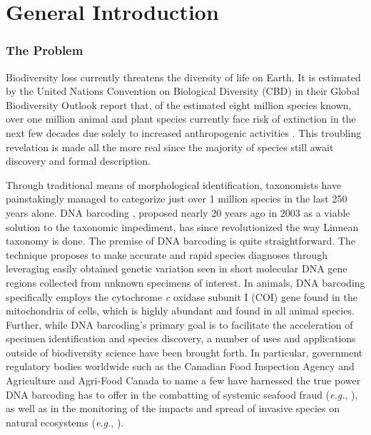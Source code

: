 \linespread{1.0}

\chapter{General Introduction}

\subsection{The Problem}

Biodiversity loss currently threatens the diversity of life on Earth. It is estimated by the United Nations Convention on Biological Diversity (CBD) in their Global Biodiversity Outlook report that, of the estimated eight million species known, over one million animal and plant species currently face risk of extinction in the next few decades due solely to increased anthropogenic activities \cite{cbd2020global}. This troubling revelation is made all the more real since the majority of species still await discovery and formal description. 

\vspace{5mm}

Through traditional means of morphological identification, taxonomists have \\ painstakingly managed to categorize just over 1 million species in the last 250 years alone. DNA barcoding \cite{hebert2003biological, hebert2003barcoding}, proposed nearly 20 years ago in 2003 as a viable solution to the taxonomic impediment, has since revolutionized the way Linnean taxonomy is done. The premise of DNA barcoding is quite straightforward. The technique proposes to make accurate and rapid species diagnoses through leveraging easily obtained genetic variation seen in short molecular DNA gene regions collected from unknown specimens of interest. In animals, DNA barcoding specifically employs the cytochrome \textit{c} oxidase subunit I (COI) gene found in the mitochondria of cells, which is highly abundant and found in all animal species. Further, while DNA barcoding's primary goal is to facilitate the acceleration of specimen identification and species discovery, a number of uses and applications outside of biodiversity science have been brought forth. In particular, government regulatory bodies worldwide such as the Canadian Food Inspection Agency and Agriculture and Agri-Food Canada to name a few have harnessed the true power DNA barcoding has to offer in the combatting of systemic seafood fraud (\textit{e.g.}, \cite{shehata2018dna, shehata2019survey}), as well as in the monitoring of the impacts and spread of invasive species on natural ecosystems (\textit{e.g.}, \cite{madden2019using}).

